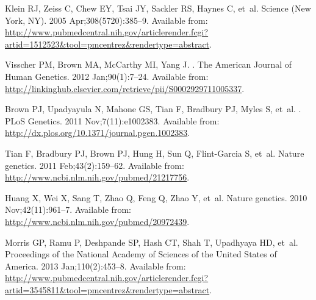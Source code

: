 \documentclass[10pt,letterpaper]{article}
\begin{document}
\begin{thebibliography}{}
%
%
% 



Klein RJ, Zeiss C, Chew EY, Tsai JY, Sackler RS, Haynes C, et~al.
\newblock Science (New York, NY). 2005 Apr;308(5720):385--9.
\newblock Available from:
  \url{http://www.pubmedcentral.nih.gov/articlerender.fcgi?artid=1512523\&tool=pmcentrez\&rendertype=abstract}.

Visscher PM, Brown MA, McCarthy MI, Yang J.
.
\newblock The American Journal of Human Genetics. 2012 Jan;90(1):7--24.
\newblock Available from:
  \url{http://linkinghub.elsevier.com/retrieve/pii/S0002929711005337}.

Brown PJ, Upadyayula N, Mahone GS, Tian F, Bradbury PJ, Myles S, et~al.
.
\newblock PLoS Genetics. 2011 Nov;7(11):e1002383.
\newblock Available from:
  \url{http://dx.plos.org/10.1371/journal.pgen.1002383}.

Tian F, Bradbury PJ, Brown PJ, Hung H, Sun Q, Flint-Garcia S, et~al.
\newblock Nature genetics. 2011 Feb;43(2):159--62.
\newblock Available from: \url{http://www.ncbi.nlm.nih.gov/pubmed/21217756}.

Huang X, Wei X, Sang T, Zhao Q, Feng Q, Zhao Y, et~al.
\newblock Nature genetics. 2010 Nov;42(11):961--7.
\newblock Available from: \url{http://www.ncbi.nlm.nih.gov/pubmed/20972439}.

Morris GP, Ramu P, Deshpande SP, Hash CT, Shah T, Upadhyaya HD, et~al.
\newblock Proceedings of the National Academy of Sciences of the United States
  of America. 2013 Jan;110(2):453--8.
\newblock Available from:
  \url{http://www.pubmedcentral.nih.gov/articlerender.fcgi?artid=3545811\&tool=pmcentrez\&rendertype=abstract}.


\end{thebibliography}
\end{document}
